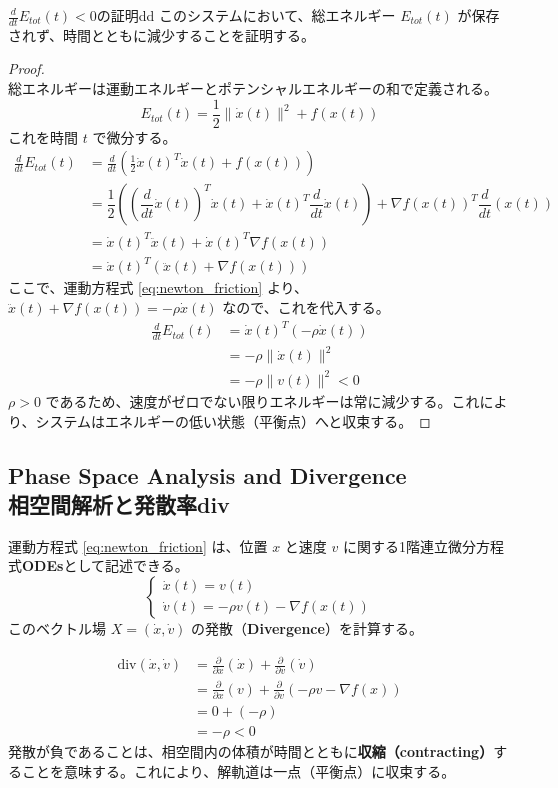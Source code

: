 \documentclass[dvipdfmx,a4paper,11pt]{jsarticle}
\begin{document}
\begin{reidai}{$\frac{d}{dt} E_{tot}(t)< 0$の証明}{dd}
  このシステムにおいて、総エネルギー $E_{tot}(t)$ が保存されず、時間とともに減少することを証明する。
\end{reidai}
\vspace{0.5em}
\begin{proof}
 \ \\
\noindent
総エネルギーは運動エネルギーとポテンシャルエネルギーの和で定義される。
\[
E_{tot}(t) = \frac{1}{2}\|\dot{x}(t)\|^2 + f(x(t))
\]
これを時間 $t$ で微分する。
\begin{align*}
    \frac{d}{dt} E_{tot}(t) &= \frac{d}{dt} \left( \frac{1}{2}\dot{x}(t)^T \dot{x}(t) + f(x(t)) \right) \\
    &= \dfrac{1}{2}((\dfrac{d}{dt}\dot{x}(t))^T \dot{x}(t) + \dot{x}(t)^T \dfrac{d}{dt}\dot{x}(t)) + \nabla f(x(t))^T \dfrac{d}{dt}(x(t)) \\
    &= \dot{x}(t)^T \ddot{x}(t) + \dot{x}(t)^T \nabla f(x(t))  \\
    &= \dot{x}(t)^T \left( \ddot{x}(t) + \nabla f(x(t)) \right)
\end{align*}
ここで、運動方程式 \eqref{eq:newton_friction} より、$\ddot{x}(t) + \nabla f(x(t)) = -\rho \dot{x}(t)$ なので、これを代入する。
\begin{align*}
\frac{d}{dt} E_{tot}(t) &= \dot{x}(t)^T \left( -\rho \dot{x}(t) \right) \\
&= -\rho \|\dot{x}(t)\|^2 \\
&= -\rho \|v(t)\|^2 < 0
\end{align*}
$\rho > 0$ であるため、速度がゼロでない限りエネルギーは常に減少する。これにより、システムはエネルギーの低い状態（平衡点）へと収束する。
\end{proof}

\subsection{Phase Space Analysis and Divergence\\ 相空間解析と発散率div}
運動方程式 \eqref{eq:newton_friction} は、位置 $x$ と速度 $v$ に関する1階連立微分方程式\textbf{ODEs}として記述できる。
\[
\begin{cases}
    \dot{x}(t) = v(t) \\
    \dot{v}(t) = -\rho v(t) - \nabla f(x(t))
\end{cases}
\]
このベクトル場 $X = (\dot{x}, \dot{v})$ の発散（\textbf{Divergence}）を計算する。

\begin{align*}
\text{div}(\dot{x}, \dot{v}) &= \frac{\partial}{\partial x}(\dot{x}) + \frac{\partial}{\partial v}(\dot{v}) \\
&= \frac{\partial}{\partial x}(v) + \frac{\partial}{\partial v}(-\rho v - \nabla f(x)) \\
&= 0 + (-\rho) \\
&= -\rho < 0
\end{align*}
発散が負であることは、相空間内の体積が時間とともに\textbf{収縮（contracting）}することを意味する。これにより、解軌道は一点（平衡点）に収束する。
\end{document}
